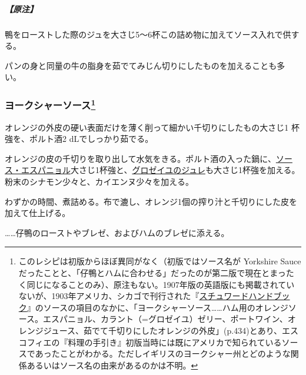 \begin{recette}
\hypertarget{nota-sage-and-onions-sauce}{%
\subparagraph{【原注】}\label{nota-sage-and-onions-sauce}}

鴨をローストした際のジュを大さじ5〜6杯この詰め物に加えてソース入れで供する。

パンの身と同量の牛の脂身を茹でてみじん切りにしたものを加えることも多い。

\atoaki{}

\hypertarget{sauce-yorkshire}{%
\subsubsection[ヨークシャーソース]{\texorpdfstring{ヨークシャーソース\footnote{このレシピは初版からほぼ異同がなく（初版ではソース名が
  Yorkshire
  Sauceだったことと、「仔鴨とハムに合わせる」だったのが第二版で現在とまったく同じになることのみ）、原注もない。1907年版の英語版にも掲載されていないが、1903年アメリカ、シカゴで刊行された『\href{https://archive.org/details/stewardshandbook00whitiala}{スチュワードハンドブック}』のソースの項目のなかに、「ヨークシャーソース\ldots{}\ldots{}ハム用のオレンジソース。エスパニョル、カラント（=グロゼイユ）ゼリー、ポートワイン、オレンジジュース、茹でて千切りにしたオレンジの外皮」(p.434)とあり、エスコフィエの『料理の手引き』初版当時には既にアメリカで知られているソースであったことがわかる。ただしイギリスのヨークシャー州とどのような関係あるいはソース名の由来があるのかは不明。}}{ヨークシャーソース}}\label{sauce-yorkshire}}



オレンジの外皮の硬い表面だけを薄く削って細かい千切りにしたもの大さじ1
杯強を、ポルト酒2 dLでしっかり茹でる。

オレンジの皮の千切りを取り出して水気をきる。ポルト酒の入った鍋に、\protect\hyperlink{sauce-espagnole}{ソース・エスパニョル}大さじ1杯強と、\protect\hyperlink{}{グロゼイユのジュレ}も大さじ1杯強を加える。粉末のシナモン少々と、カイエンヌ少々を加える。

わずかの時間、煮詰める。布で漉し、オレンジ1個の搾り汁と千切りにした皮を加えて仕上げる。

\ldots{}\ldots{}仔鴨のローストやブレゼ、およびハムのブレゼに添える。

\end{recette}
